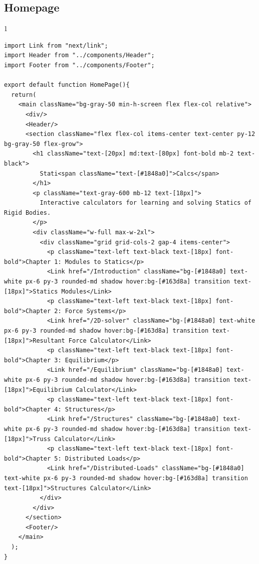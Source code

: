 \subsection*{Homepage}
\begin{spacing}{1}
\begin{Verbatim}[breaklines=true, breaksymbolleft={}, breaksymbolright={}]
import Link from "next/link";
import Header from "../components/Header";
import Footer from "../components/Footer";

export default function HomePage(){
  return(
    <main className="bg-gray-50 min-h-screen flex flex-col relative">
      <div/>
      <Header/>
      <section className="flex flex-col items-center text-center py-12 bg-gray-50 flex-grow">
        <h1 className="text-[20px] md:text-[80px] font-bold mb-2 text-black">
          Stati<span className="text-[#1848a0]">Calcs</span>
        </h1>
        <p className="text-gray-600 mb-12 text-[18px]">
          Interactive calculators for learning and solving Statics of Rigid Bodies.
        </p>
        <div className="w-full max-w-2xl">
          <div className="grid grid-cols-2 gap-4 items-center">
            <p className="text-left text-black text-[18px] font-bold">Chapter 1: Modules to Statics</p>
            <Link href="/Introduction" className="bg-[#1848a0] text-white px-6 py-3 rounded-md shadow hover:bg-[#163d8a] transition text-[18px]">Statics Modules</Link>
            <p className="text-left text-black text-[18px] font-bold">Chapter 2: Force Systems</p>
            <Link href="/2D-solver" className="bg-[#1848a0] text-white px-6 py-3 rounded-md shadow hover:bg-[#163d8a] transition text-[18px]">Resultant Force Calculator</Link>
            <p className="text-left text-black text-[18px] font-bold">Chapter 3: Equilibrium</p>
            <Link href="/Equilibrium" className="bg-[#1848a0] text-white px-6 py-3 rounded-md shadow hover:bg-[#163d8a] transition text-[18px]">Equilibrium Calculator</Link>
            <p className="text-left text-black text-[18px] font-bold">Chapter 4: Structures</p>
            <Link href="/Structures" className="bg-[#1848a0] text-white px-6 py-3 rounded-md shadow hover:bg-[#163d8a] transition text-[18px]">Truss Calculator</Link>
            <p className="text-left text-black text-[18px] font-bold">Chapter 5: Distributed Loads</p>
            <Link href="/Distributed-Loads" className="bg-[#1848a0] text-white px-6 py-3 rounded-md shadow hover:bg-[#163d8a] transition text-[18px]">Structures Calculator</Link>
          </div>
        </div>
      </section>
      <Footer/>
    </main>
  );
}
\end{Verbatim}
\end{spacing}

